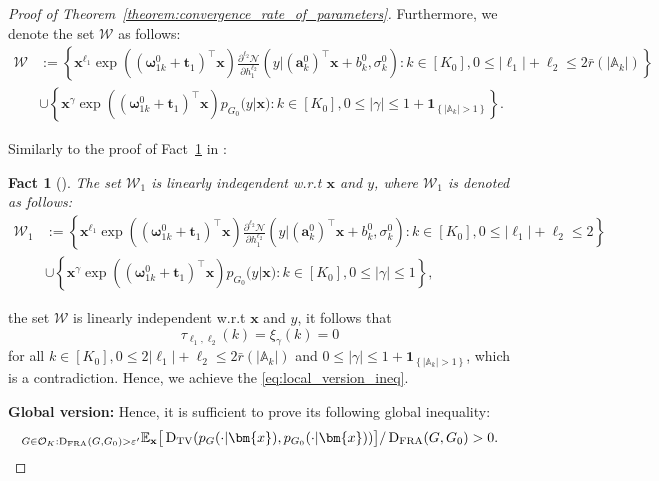\documentclass[twoside]{article}
\DeclareMathOperator*{\VDFRA}{D_{FRA}}
\DeclareMathOperator*{\TV}{D_{TV}}
\let\inf\relax
\DeclareMathOperator*\inf{\vphantom{p}inf}
\theoremstyle{plain}
\newtheorem{fact}{Fact}
\theoremstyle{definition}
\theoremstyle{plain}
\def\rvx{{\mathbf{x}}}
\def\vomega{{\bm{\omega}}}
\def\vell{{\bm{\ell}}}
\def\va{{\bm{a}}}
\def\vt{{\bm{t}}}
\def\vx{{\bm{x}}}
\def\sA{{\mathbb{A}}}
\newcommand{\bbE}{\mathbb{E}}
\newcommand{\cN}{\mathcal{N}}
\newcommand{\cO}{\mathcal{O}}
\newcommand{\cW}{\mathcal{W}}
\begin{document}
\begin{proof}[Proof of Theorem~\ref{theorem:convergence_rate_of_parameters}]
Furthermore, we denote the set $\cW$ as follows:
\begin{align}
\cW &:=\left\{\vx^{\vell_{1}} \exp \left(\left(\vomega_{1 k}^{0}+\vt_{1}\right)^{\top} \vx\right) \frac{\partial^{\ell_{2}} \cN}{\partial h_{1}^{\ell_{2}}}\left(y|\left(\va_{k}^{0}\right)^{\top} \vx+b_{k}^{0}, \sigma_{k}^{0}\right): k \in\left[K_0\right], 0 \leq \left|\vell_{1}\right|+\ell_{2} \leq 2 \bar{r}\left(\left|\sA_k\right|\right)\right\} \nonumber \\
\quad&\cup\left\{\vx^{\gamma} \exp \left(\left(\vomega_{1 k}^{0}+\vt_{1}\right)^{\top} \vx\right) p_{G_{0}}(y|\vx): k \in\left[K_0\right], 0 \leq|\gamma| \leq 1+\mathbf{1}_{\left\{\left|\sA_k\right|>1\right\}}\right\}. \nonumber
\end{align}

Similarly to the proof of Fact~\ref{lem:set_independent} in \citealp{nguyen_demystifying_2023}:
\begin{fact}[{\citealp[Lemma 2]{nguyen_demystifying_2023}}]\label{lem:set_independent}
    The set $\cW_1$ is linearly indeqendent w.r.t $\vx$ and $y$, where $\cW_1$ is denoted as follows:
    \begin{align}
\cW_1 &:=\left\{\vx^{\vell_{1}} \exp \left(\left(\vomega_{1 k}^{0}+\vt_{1}\right)^{\top} \vx\right) \frac{\partial^{\ell_{2}} \cN}{\partial h_{1}^{\ell_{2}}}\left(y|\left(\va_{k}^{0}\right)^{\top} \vx+b_{k}^{0}, \sigma_{k}^{0}\right): k \in\left[K_0\right], 0 \leq \left|\vell_{1}\right|+\ell_{2} \leq 2 \right\} \nonumber \\
\quad&\cup\left\{\vx^{\gamma} \exp \left(\left(\vomega_{1 k}^{0}+\vt_{1}\right)^{\top} \vx\right) p_{G_{0}}(y|\vx): k \in\left[K_0\right], 0 \leq|\gamma| \leq 1\right\}, \nonumber
\end{align}
\end{fact}

the set $\cW$ is linearly independent w.r.t $\vx$ and $y$, it follows that
\[
\tau_{\vell_{1}, \ell_{2}}(k)=\xi_{\gamma}(k)=0
\]
for all $k \in\left[K_0\right], 0 \leq 2\left|\ell_{1}\right|+\ell_{2} \leq 2 \bar{r}\left(\left|\sA_k\right|\right)$ and $0 \leq|\gamma| \leq 1+\mathbf{1}_{\left\{\left|\sA_k\right|>1\right\}}$, which is a contradiction. Hence, we achieve the \cref{eq:local_version_ineq}.

\textbf{Global version:} Hence, it is sufficient to prove its following global inequality:
\begin{equation}
    \inf_{G \in \cO_K:\VDFRA (G, G_0) > \varepsilon^{\prime}} \bbE_\rvx\big[\TV(p_G(\cdot|\vx),p_{G_0}(\cdot|\vx))\big]/\VDFRA (G, G_0) > 0.\label{eq:global_ineq}
\end{equation}


\end{proof}
\end{document}

